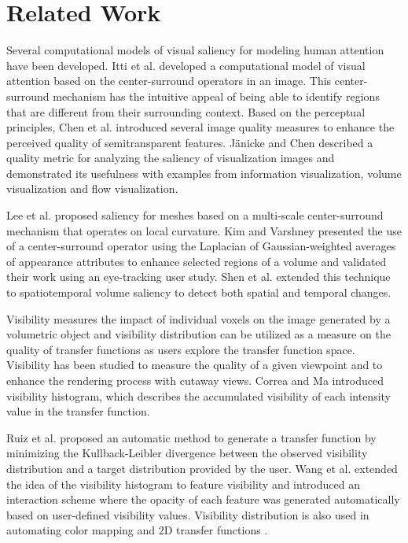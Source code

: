 \section{Related Work}
Several computational models of visual saliency for modeling human attention have been developed.
Itti et al. \cite{itti_model_1998} developed a computational model of visual attention based on the center-surround operators in an image. This center-surround mechanism has the intuitive appeal of being able to identify regions that are different from their surrounding context.
Based on the perceptual principles, Chen et al. \cite{chan_perception-based_2009} introduced several image quality measures to enhance the perceived quality of semitransparent features.
J{\"a}nicke and Chen \cite{janicke_salience-based_2010} described a quality metric for analyzing the saliency of visualization images and demonstrated its usefulness with examples from information visualization, volume visualization and flow visualization.

Lee et al. \cite{lee_mesh_2005} proposed saliency for meshes based on a multi-scale center-surround mechanism that operates on local curvature. Kim and Varshney \cite{kim_saliency-guided_2006} presented the use of a center-surround operator using the Laplacian of Gaussian-weighted averages of appearance attributes to enhance selected regions of a volume and validated their work using an eye-tracking user study. Shen et al. \cite{shen_spatiotemporal_2015} extended this technique to spatiotemporal volume saliency to detect both spatial and temporal changes.

Visibility measures the impact of individual voxels on the image generated by a volumetric object and visibility distribution can be utilized as a measure on the quality of transfer functions as users explore the transfer function space. Visibility has been studied to measure the quality of a given viewpoint \cite{bordoloi_view_2005} \cite{viola_importance-driven_2004} and to enhance the rendering process with cutaway views.
Correa and Ma \cite{correa_visibility_2011} introduced visibility histogram, which describes the accumulated visibility of each intensity value in the transfer function.

Ruiz et al. \cite{ruiz_automatic_2011} proposed an automatic method to generate a transfer function by minimizing the Kullback-Leibler divergence between the observed visibility distribution and a target distribution provided by the user. Wang et al. \cite{wang_efficient_2011} extended the idea of the visibility histogram to feature visibility and introduced an interaction scheme where the opacity of each feature was generated automatically based on user-defined visibility values. Visibility distribution is also used in automating color mapping \cite{cai_automatic_2013} and 2D transfer functions \cite{qin_voxel_2015}.

